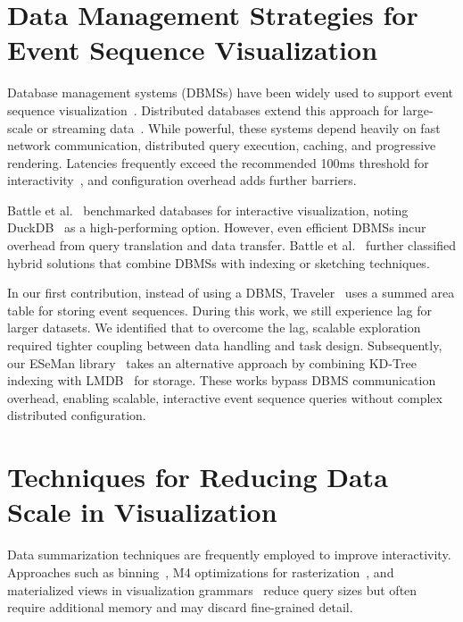 \begin{refsection}
\section[Data Management Strategies for Event Sequence Visualization]{Data Management Strategies for \\ Event Sequence Visualization}
Database management systems (DBMSs) have been widely used to support event sequence visualization~\cite{bell2003paraprof,sun2021daisen,battle2016dynamic,agarwal2013blinkdb,heer2023mosaic}. Distributed databases extend this approach for large-scale or streaming data~\cite{moritz2015perfopticon,kaldor2017canopy,kruchten2022vegafusion,shen2023qevis,kesavan2020visual,khan2023web}. While powerful, these systems depend heavily on fast network communication, distributed query execution, caching, and progressive rendering. Latencies frequently exceed the recommended 100ms threshold for interactivity~\cite{kaldor2017canopy,kruchten2022vegafusion}, and configuration overhead adds further barriers.

Battle et al.~\cite{battle2020database} benchmarked databases for interactive visualization, noting DuckDB~\cite{duckdbmanual} as a high-performing option. However, even efficient DBMSs incur overhead from query translation and data transfer. Battle et al.~\cite{battle2020structured} further classified hybrid solutions that combine DBMSs with indexing or sketching techniques.

In our first contribution, instead of using a DBMS, Traveler~\cite{sakin2022traveler} uses a summed area table for storing event sequences. During this work, we still experience lag for larger datasets. We identified that to overcome the lag, scalable exploration required tighter coupling between data handling and task design. Subsequently, our ESeMan library~\cite{sakin2025managing} takes an alternative approach by combining KD-Tree indexing with LMDB~\cite{lmdb} for storage. These works bypass DBMS communication overhead, enabling scalable, interactive event sequence queries without complex distributed configuration.

\section{Techniques for Reducing Data Scale in Visualization}

Data summarization techniques are frequently employed to improve interactivity. Approaches such as binning~\cite{carr1987scatterplot,liu2013immens}, M4 optimizations for rasterization~\cite{jugel2014m4}, and materialized views in visualization grammars~\cite{satyanarayan2016vega,heer2023mosaic,battle2020structured} reduce query sizes but often require additional memory and may discard fine-grained detail.


\end{refsection}
